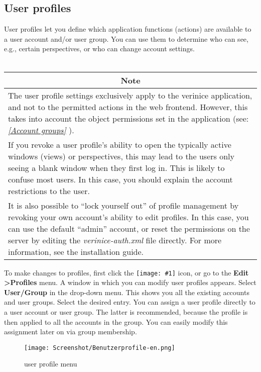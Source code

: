 \documentclass[a4paper,10pt]{book}
\newcommand{\icon}[1]{\texttt{[image: \#1]}}
\begin{document}
\subsection{User profiles} \label{sec:User-profiles}
User profiles let you define which application functions (actions) are available to a user account and/or user group.
You can use them to determine who can see, e.g., certain perspectives, or who can change account settings.
\newline\\\
\begin{longtable}{| p{} |}
\hline
\multicolumn{1}{|c|}{\textbf{Note}} \\[10pt]
\hline\hline
The user profile settings exclusively apply to the verinice application, and not to the permitted actions in the web frontend. However, this takes into account the object permissions set in the application (see: {\em \ref{Account groups} \nameref{Account groups}}). \\[10pt] \hline
If you revoke a user profile's ability to open the typically active windows (views) or perspectives, this may lead to the users only seeing a blank window when they first log in. This is likely to confuse most users. In this case, you should explain the account restrictions to the user. \\[10pt] \hline
It is also possible to ``lock yourself out'' of profile management by revoking your own account's ability to edit profiles. In this case, you can use the default ``admin'' account, or reset the permissions on the server by editing the \textit{verinice-auth.xml} file directly. For more information, see the installation guide. \\[10pt] \hline
\end{longtable}
To make changes to profiles, first click the \icon{Icon/Berechtigungsprofile.png} icon,
or go to the \textbf{Edit \textgreater Profiles} menu. A window in which you can modify user profiles appears. Select
\textbf{User/Group} in the drop-down menu. This shows you all the existing accounts and user groups. Select the
desired entry. You can assign a user profile directly to a user account or user group. The latter is recommended,
because the profile is then applied to all the accounts in the group. You can easily modify this assignment later
on via group membership.
\newline
\begin{figure}[htb!]
  \centering
  \texttt{[image: Screenshot/Benutzerprofile-en.png]}
  \caption{\label{User profile menu} user profile menu}
\end{figure}
\end{document}
